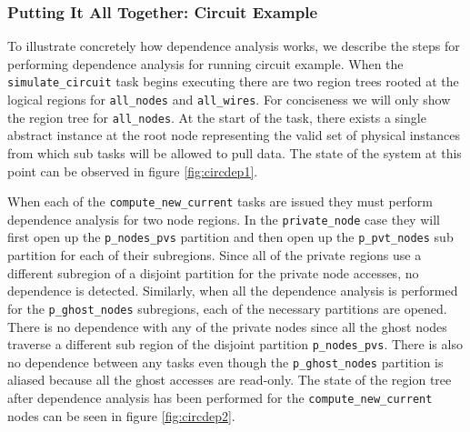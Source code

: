 \subsubsection{Putting It All Together: Circuit Example}
\label{subsec:cirdependence}
To illustrate concretely how dependence analysis works, we describe the steps for
performing dependence analysis for running circuit example.  When the {\tt simulate\_circuit}
task begins executing there are two region trees rooted at the logical
regions for {\tt all\_nodes} and {\tt all\_wires}.  For conciseness we will only
show the region tree for {\tt all\_nodes}.  At the start of the task, there exists
a single abstract instance at the root node representing the valid set of physical
instances from which sub tasks will be allowed to pull data.  The state of the
system at this point can be observed in figure \ref{fig:circdep1}.

When each of the {\tt compute\_new\_current} tasks are issued they must perform dependence
analysis for two node regions.  In the {\tt private\_node} case they will first open
up the {\tt p\_nodes\_pvs} partition and then open up the {\tt p\_pvt\_nodes} sub partition
for each of their subregions.  Since all of the private regions use a different subregion
of a disjoint partition for the private node accesses, no dependence is detected.  Similarly,
when all the dependence analysis is performed for the {\tt p\_ghost\_nodes} subregions,
each of the necessary partitions are opened.  There is no dependence with any of the private
nodes since all the ghost nodes traverse a different sub region of the disjoint partition
{\tt p\_nodes\_pvs}.  There is also no dependence between any tasks even though the
{\tt p\_ghost\_nodes} partition is aliased because all the ghost accesses are read-only.
The state of the region tree after dependence analysis has been performed for the
{\tt compute\_new\_current} nodes can be seen in figure \ref{fig:circdep2}.

